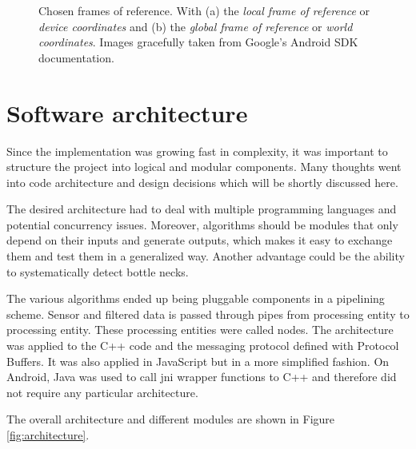 \begin{figure}[hbt!]
\begin{subfigure}{0.4\textwidth}
        \caption{}
    \end{subfigure}
    \caption{Chosen frames of reference. With (a) the \textit{local frame of reference} or \textit{device coordinates} and (b) the \textit{global frame of reference} or \textit{world coordinates}. Images gracefully taken from Google's Android SDK documentation.\cite{android_sdk_sensorevent}}
    \label{fig:frames_of_reference}
\end{figure}

\section{Software architecture}

Since the implementation was growing fast in complexity, it was important to structure the project into logical and modular components. Many thoughts went into code architecture and design decisions which will be shortly discussed here.

The desired architecture had to deal with multiple programming languages and potential concurrency issues. Moreover, algorithms should be modules that only depend on their inputs and generate outputs, which makes it easy to exchange them and test them in a generalized way. Another advantage could be the ability to systematically detect bottle necks.

The various algorithms ended up being pluggable components in a pipelining scheme. Sensor and filtered data is passed through pipes from processing entity to processing entity. These processing entities were called nodes. The architecture was applied to the C++ code and the messaging protocol defined with Protocol Buffers. It was also applied in JavaScript but in a more simplified fashion. On Android, Java was used to call \gls{jni} wrapper functions to C++ and therefore did not require any particular architecture.

The overall architecture and different modules are shown in Figure \ref{fig:architecture}.

